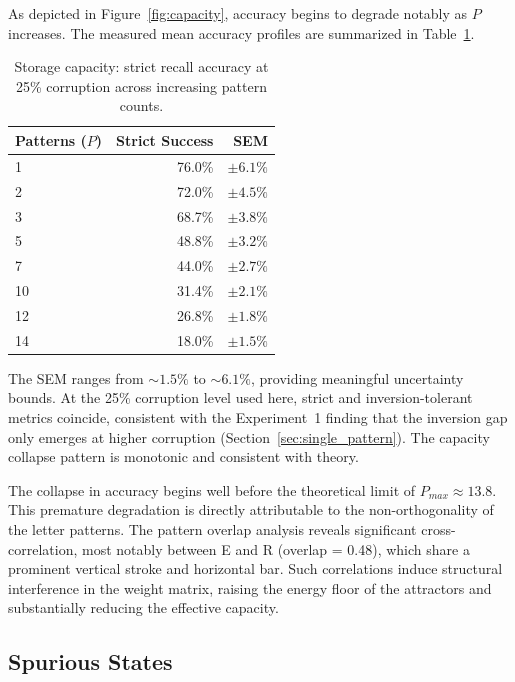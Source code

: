 \documentclass[11pt,a4paper,twocolumn]{article}
\begin{document}
As depicted in Figure~\ref{fig:capacity}, accuracy begins to degrade notably
as $P$ increases. The measured mean accuracy profiles are summarized in
Table~\ref{tab:capacity}.

\begin{table}[H]
    \centering
    \caption{Storage capacity: strict recall accuracy at 25\% corruption
    across increasing pattern counts.}
    \label{tab:capacity}
    \begin{tabular}{lrr}
        \toprule
        \textbf{Patterns ($P$)} & \textbf{Strict Success} & \textbf{SEM} \\
        \midrule
        1  & 76.0\% & $\pm 6.1\%$ \\
        2  & 72.0\% & $\pm 4.5\%$ \\
        3  & 68.7\% & $\pm 3.8\%$ \\
        5  & 48.8\% & $\pm 3.2\%$ \\
        7  & 44.0\% & $\pm 2.7\%$ \\
        10 & 31.4\% & $\pm 2.1\%$ \\
        12 & 26.8\% & $\pm 1.8\%$ \\
        14 & 18.0\% & $\pm 1.5\%$ \\
        \bottomrule
    \end{tabular}
\end{table}

The SEM ranges from $\sim 1.5\%$ to $\sim 6.1\%$, providing meaningful
uncertainty bounds. At the 25\% corruption level used here, strict and
inversion-tolerant metrics coincide, consistent with the Experiment~1 finding
that the inversion gap only emerges at higher corruption
(Section~\ref{sec:single_pattern}). The capacity collapse pattern is monotonic
and consistent with theory.

The collapse in accuracy begins well before the theoretical limit of
$P_{max} \approx 13.8$. This premature degradation is directly attributable to
the non-orthogonality of the letter patterns. The pattern overlap analysis
reveals significant cross-correlation, most notably between E and R
(overlap = 0.48), which share a prominent vertical stroke and horizontal bar.
Such correlations induce structural interference in the weight matrix, raising
the energy floor of the attractors and substantially reducing the effective
capacity.

\subsection{Spurious States}
\label{sec:spurious}
\end{document}
